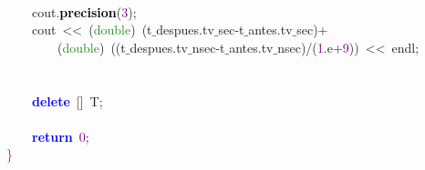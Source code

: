 \mbox{}\ \ \ \  \\
\mbox{}\ \ \ \ cout\textcolor{BrickRed}{.}\textbf{\textcolor{Black}{precision}}\textcolor{BrickRed}{(}\textcolor{Purple}{3}\textcolor{BrickRed}{);} \\
\mbox{}\ \ \ \ cout\ \textcolor{BrickRed}{\textless{}\textless{}}\ \textcolor{BrickRed}{(}\textcolor{ForestGreen}{double}\textcolor{BrickRed}{)}\ \textcolor{BrickRed}{(}t$\_$despues\textcolor{BrickRed}{.}tv$\_$sec\textcolor{BrickRed}{-}t$\_$antes\textcolor{BrickRed}{.}tv$\_$sec\textcolor{BrickRed}{)+} \\
\mbox{}\ \ \ \ \ \ \ \ \textcolor{BrickRed}{(}\textcolor{ForestGreen}{double}\textcolor{BrickRed}{)}\ \textcolor{BrickRed}{((}t$\_$despues\textcolor{BrickRed}{.}tv$\_$nsec\textcolor{BrickRed}{-}t$\_$antes\textcolor{BrickRed}{.}tv$\_$nsec\textcolor{BrickRed}{)/(}\textcolor{Purple}{1}\textcolor{BrickRed}{.}e\textcolor{BrickRed}{+}\textcolor{Purple}{9}\textcolor{BrickRed}{))}\ \textcolor{BrickRed}{\textless{}\textless{}}\ endl\textcolor{BrickRed}{;} \\
\mbox{} \\
\mbox{}\ \ \ \  \\
\mbox{}\ \ \ \ \textbf{\textcolor{Blue}{delete}}\ \textcolor{BrickRed}{[]}\ T\textcolor{BrickRed}{;} \\
\mbox{}\ \ \ \  \\
\mbox{}\ \ \ \ \textbf{\textcolor{Blue}{return}}\ \textcolor{Purple}{0}\textcolor{BrickRed}{;} \\
\mbox{}\textcolor{Red}{\}}
